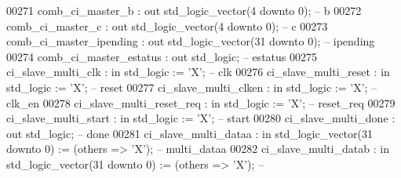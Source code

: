 \begin{DoxyCode}
00271             comb\_ci\_master\_b          : \textcolor{keywordflow}{out} \textcolor{comment}{std\_logic\_vector}(\textcolor{vhdllogic}{}\textcolor{vhdllogic}{4} \textcolor{keywordflow}{downto} \textcolor{vhdllogic}{}\textcolor{vhdllogic}{0});                     \textcolor{keyword}{-- b}
00272             comb\_ci\_master\_c          : \textcolor{keywordflow}{out} \textcolor{comment}{std\_logic\_vector}(\textcolor{vhdllogic}{}\textcolor{vhdllogic}{4} \textcolor{keywordflow}{downto} \textcolor{vhdllogic}{}\textcolor{vhdllogic}{0});                     \textcolor{keyword}{-- c}
00273             comb\_ci\_master\_ipending   : \textcolor{keywordflow}{out} \textcolor{comment}{std\_logic\_vector}(\textcolor{vhdllogic}{}\textcolor{vhdllogic}{31} \textcolor{keywordflow}{downto} \textcolor{vhdllogic}{}\textcolor{vhdllogic}{0});                    \textcolor{keyword}{-- ipending}
00274             comb\_ci\_master\_estatus    : \textcolor{keywordflow}{out} \textcolor{comment}{std\_logic};                                        \textcolor{keyword}{-- estatus}
00275             ci\_slave\_multi\_clk        : \textcolor{keywordflow}{in}  \textcolor{comment}{std\_logic}                     := 'X';             \textcolor{keyword}{-- clk}
00276             ci\_slave\_multi\_reset      : \textcolor{keywordflow}{in}  \textcolor{comment}{std\_logic}                     := 'X';             \textcolor{keyword}{-- reset}
00277             ci\_slave\_multi\_clken      : \textcolor{keywordflow}{in}  \textcolor{comment}{std\_logic}                     := 'X';             \textcolor{keyword}{-- clk\_en}
00278             ci\_slave\_multi\_reset\_req  : \textcolor{keywordflow}{in}  \textcolor{comment}{std\_logic}                     := 'X';             \textcolor{keyword}{-- reset\_req}
00279             ci\_slave\_multi\_start      : \textcolor{keywordflow}{in}  \textcolor{comment}{std\_logic}                     := 'X';             \textcolor{keyword}{-- start}
00280             ci\_slave\_multi\_done       : \textcolor{keywordflow}{out} \textcolor{comment}{std\_logic};                                        \textcolor{keyword}{-- done}
00281             ci\_slave\_multi\_dataa      : \textcolor{keywordflow}{in}  \textcolor{comment}{std\_logic\_vector}(\textcolor{vhdllogic}{}\textcolor{vhdllogic}{31} \textcolor{keywordflow}{downto} \textcolor{vhdllogic}{}\textcolor{vhdllogic}{0}) := (\textcolor{keywordflow}{others} => 'X'); \textcolor{keyword}{--
       multi\_dataa}
00282             ci\_slave\_multi\_datab      : \textcolor{keywordflow}{in}  \textcolor{comment}{std\_logic\_vector}(\textcolor{vhdllogic}{}\textcolor{vhdllogic}{31} \textcolor{keywordflow}{downto} \textcolor{vhdllogic}{}\textcolor{vhdllogic}{0}) := (\textcolor{keywordflow}{others} => 'X'); \textcolor{keyword}{--
}
\end{DoxyCode}

